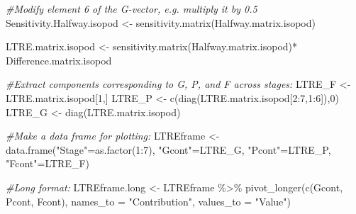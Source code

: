 \documentclass[
]{book}
\newenvironment{Shaded}{\begin{snugshade}}{\end{snugshade}}
\newcommand{\AttributeTok}[1]{\textcolor[rgb]{0.77,0.63,0.00}{#1}}
\newcommand{\CommentTok}[1]{\textcolor[rgb]{0.56,0.35,0.01}{\textit{#1}}}
\newcommand{\DecValTok}[1]{\textcolor[rgb]{0.00,0.00,0.81}{#1}}
\newcommand{\FunctionTok}[1]{\textcolor[rgb]{0.00,0.00,0.00}{#1}}
\newcommand{\NormalTok}[1]{#1}
\newcommand{\OtherTok}[1]{\textcolor[rgb]{0.56,0.35,0.01}{#1}}
\newcommand{\SpecialCharTok}[1]{\textcolor[rgb]{0.00,0.00,0.00}{#1}}
\newcommand{\StringTok}[1]{\textcolor[rgb]{0.31,0.60,0.02}{#1}}
\begin{document}
\begin{Shaded}
\begin{Highlighting}[]
\CommentTok{\#Modify element 6 of the G{-}vector, e.g. multiply it by 0.5}
\NormalTok{Sensitivity.Halfway.isopod }\OtherTok{\textless{}{-}} 
  \FunctionTok{sensitivity.matrix}\NormalTok{(Halfway.matrix.isopod)}

\NormalTok{LTRE.matrix.isopod }\OtherTok{\textless{}{-}} \FunctionTok{sensitivity.matrix}\NormalTok{(Halfway.matrix.isopod)}\SpecialCharTok{*}
\NormalTok{  Difference.matrix.isopod}

\CommentTok{\#Extract components corresponding to G, P, and F across stages:}
\NormalTok{LTRE\_F }\OtherTok{\textless{}{-}}\NormalTok{ LTRE.matrix.isopod[}\DecValTok{1}\NormalTok{,] }
\NormalTok{LTRE\_P }\OtherTok{\textless{}{-}} \FunctionTok{c}\NormalTok{(}\FunctionTok{diag}\NormalTok{(LTRE.matrix.isopod[}\DecValTok{2}\SpecialCharTok{:}\DecValTok{7}\NormalTok{,}\DecValTok{1}\SpecialCharTok{:}\DecValTok{6}\NormalTok{]),}\DecValTok{0}\NormalTok{)}
\NormalTok{LTRE\_G }\OtherTok{\textless{}{-}} \FunctionTok{diag}\NormalTok{(LTRE.matrix.isopod)}
  

\CommentTok{\#Make a data frame for plotting:}
\NormalTok{LTREframe }\OtherTok{\textless{}{-}} \FunctionTok{data.frame}\NormalTok{(}\StringTok{"Stage"}\OtherTok{=}\FunctionTok{as.factor}\NormalTok{(}\DecValTok{1}\SpecialCharTok{:}\DecValTok{7}\NormalTok{),}
                        \StringTok{"Gcont"}\OtherTok{=}\NormalTok{LTRE\_G,}
                        \StringTok{"Pcont"}\OtherTok{=}\NormalTok{LTRE\_P, }
                        \StringTok{"Fcont"}\OtherTok{=}\NormalTok{LTRE\_F)}

\CommentTok{\#Long format:}
\NormalTok{LTREframe.long }\OtherTok{\textless{}{-}}\NormalTok{ LTREframe }\SpecialCharTok{\%\textgreater{}\%} 
  \FunctionTok{pivot\_longer}\NormalTok{(}\FunctionTok{c}\NormalTok{(Gcont, Pcont, Fcont), }
               \AttributeTok{names\_to =} \StringTok{"Contribution"}\NormalTok{, }
               \AttributeTok{values\_to =} \StringTok{"Value"}\NormalTok{)}
 


\end{Highlighting}
\end{Shaded}
\end{document}

